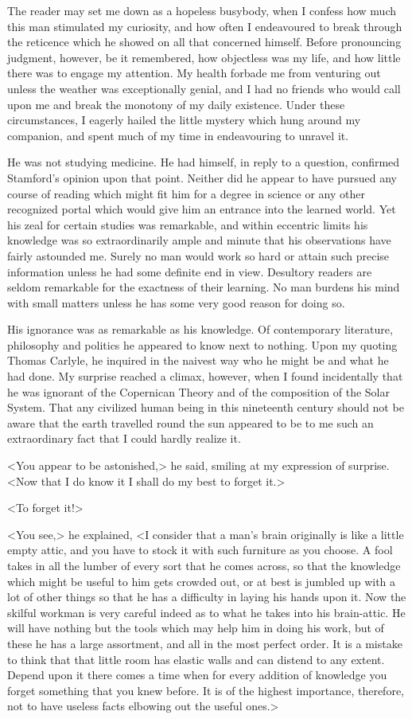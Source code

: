 The reader may set me down as a hopeless busybody, when I confess how much this man stimulated my curiosity, and how often I endeavoured to break through the reticence which he showed on all that concerned himself. Before pronouncing judgment, however, be it remembered, how objectless was my life, and how little there was to engage my attention. My health forbade me from venturing out unless the weather was exceptionally genial, and I had no friends who would call upon me and break the monotony of my daily existence. Under these circumstances, I eagerly hailed the little mystery which hung around my companion, and spent much of my time in endeavouring to unravel it.

He was not studying medicine. He had himself, in reply to a question, confirmed Stamford's opinion upon that point. Neither did he appear to have pursued any course of reading which might fit him for a degree in science or any other recognized portal which would give him an entrance into the learned world. Yet his zeal for certain studies was remarkable, and within eccentric limits his knowledge was so extraordinarily ample and minute that his observations have fairly astounded me. Surely no man would work so hard or attain such precise information unless he had some definite end in view. Desultory readers are seldom remarkable for the exactness of their learning. No man burdens his mind with small matters unless he has some very good reason for doing so.

His ignorance was as remarkable as his knowledge. Of contemporary literature, philosophy and politics he appeared to know next to nothing. Upon my quoting Thomas Carlyle, he inquired in the naivest way who he might be and what he had done. My surprise reached a climax, however, when I found incidentally that he was ignorant of the Copernican Theory and of the composition of the Solar System. That any civilized human being in this nineteenth century should not be aware that the earth travelled round the sun appeared to be to me such an extraordinary fact that I could hardly realize it.

<You appear to be astonished,> he said, smiling at my expression of surprise. <Now that I do know it I shall do my best to forget it.>

<To forget it!>

<You see,> he explained, <I consider that a man's brain originally is like a little empty attic, and you have to stock it with such furniture as you choose. A fool takes in all the lumber of every sort that he comes across, so that the knowledge which might be useful to him gets crowded out, or at best is jumbled up with a lot of other things so that he has a difficulty in laying his hands upon it. Now the skilful workman is very careful indeed as to what he takes into his brain-attic. He will have nothing but the tools which may help him in doing his work, but of these he has a large assortment, and all in the most perfect order. It is a mistake to think that that little room has elastic walls and can distend to any extent. Depend upon it there comes a time when for every addition of knowledge you forget something that you knew before. It is of the highest importance, therefore, not to have useless facts elbowing out the useful ones.>


